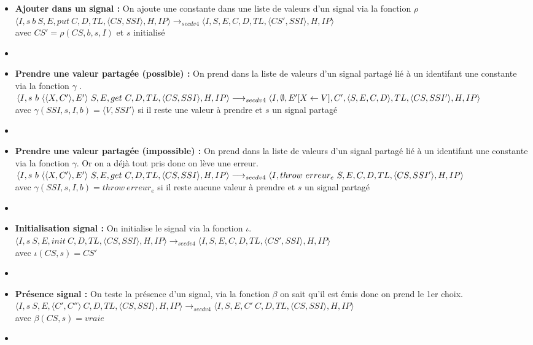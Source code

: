 \documentclass[10pt,a4paper]{report}
\begin{document}
\begin{enumerate}
\begin{itemize}
			\item[] \textbf{Ajouter dans un signal :} On ajoute une constante dans une liste de valeurs d'un signal via la fonction $\rho$
			\smallbreak
			$\langle I,s~b~S,E,put~C,D,TL,\langle CS,SSI\rangle,H,IP\rangle \longrightarrow_{secdv4} \langle I,S,E,C,D,TL,\langle CS',SSI\rangle,H,IP\rangle$ \\
			avec $CS' = \rho(CS,b,s,I)$ et $s$ initialisé
			\item[]
			
			\item[] \textbf{Prendre une valeur partagée (possible) :} On prend dans la liste de valeurs d'un signal partagé lié à un identifant une constante via la fonction $\gamma$ .
			\smallbreak
			$\langle I,s~b~\langle\langle X,C'\rangle,E'\rangle~S,E,get~C,D,TL,\langle CS,SSI\rangle,H,IP\rangle 
			\\\longrightarrow_{secdv4} \langle I,\emptyset,E'[X \leftarrow V],C',\langle S,E,C,D\rangle,TL,\langle CS,SSI'\rangle,H,IP\rangle$\\
			avec $ \gamma(SSI,s,I,b) = \langle V,SSI'\rangle$ si il reste une valeur à prendre et $s$ un signal partagé
			\item[]
			
			\item[] \textbf{Prendre une valeur partagée (impossible) :} On prend dans la liste de valeurs d'un signal partagé lié à un identifant une constante via la fonction $\gamma$. Or on a déjà tout pris donc on lève une erreur.
			\smallbreak 
			$\langle I,s~b~\langle\langle X,C'\rangle,E'\rangle~S,E,get~C,D,TL,\langle CS,SSI\rangle,H,IP\rangle 
			\\\longrightarrow_{secdv4} \langle I,throw~erreur_{e}~S,E,C,D,TL,\langle CS,SSI'\rangle,H,IP\rangle$\\
			avec $ \gamma(SSI,s,I,b) = throw~erreur_{e}$ si il reste aucune valeur à prendre et $s$ un signal partagé
			\item[]
			
			\item[] \textbf{Initialisation signal :} On initialise le signal via la fonction $\iota$.
			\smallbreak 
			$\langle I,s~S,E,init~C,D,TL,\langle CS,SSI\rangle,H,IP\rangle 
			\longrightarrow_{secdv4} \langle I,S,E,C,D,TL,\langle CS',SSI\rangle,H,IP\rangle$\\
			avec $\iota(CS,s) = CS'$
			\item[]	
			
			\item[] \textbf{Présence signal :} On teste la présence d'un signal, via la fonction $\beta$ on sait qu'il est émis donc on prend le 1er choix.
			\smallbreak
			$\langle I,s~S,E,\langle C',C''\rangle~C,D,TL,\langle CS,SSI\rangle,H,IP\rangle 
			\longrightarrow_{secdv4} \langle I,S,E,C'~C,D,TL,\langle CS,SSI\rangle,H,IP\rangle$ \\
			avec $\beta(CS,s) = vraie$
			\item[]
			

\end{itemize}
\end{enumerate}
\end{document}
